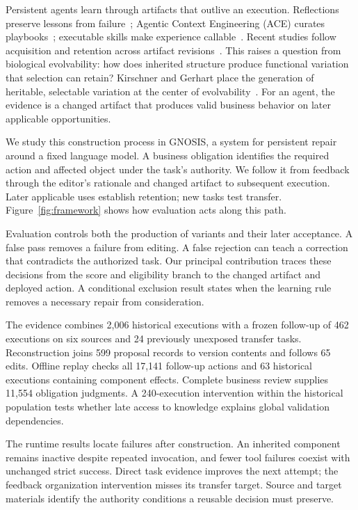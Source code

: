 \documentclass{ecai}
\newcommand{\Gnosis}{GNOSIS}
\begin{document}
Persistent agents learn through artifacts that outlive an execution. Reflections preserve lessons from failure~\cite{reflexion}; Agentic Context Engineering (ACE) curates playbooks~\cite{ace}; executable skills make experience callable~\cite{voyager}. Recent studies follow acquisition and retention across artifact revisions~\cite{singh2026agentplasticity,lin2026beyondendpoint}. This raises a question from biological evolvability: how does inherited structure produce functional variation that selection can retain? Kirschner and Gerhart place the generation of heritable, selectable variation at the center of evolvability~\cite{kirschner1998evolvability}. For an agent, the evidence is a changed artifact that produces valid business behavior on later applicable opportunities.

We study this construction process in \Gnosis{}, a system for persistent repair around a fixed language model. A business obligation identifies the required action and affected object under the task's authority. We follow it from feedback through the editor's rationale and changed artifact to subsequent execution. Later applicable uses establish retention; new tasks test transfer. Figure~\ref{fig:framework} shows how evaluation acts along this path.

Evaluation controls both the production of variants and their later acceptance. A false pass removes a failure from editing. A false rejection can teach a correction that contradicts the authorized task. Our principal contribution traces these decisions from the score and eligibility branch to the changed artifact and deployed action. A conditional exclusion result states when the learning rule removes a necessary repair from consideration.

The evidence combines 2,006 historical executions with a frozen follow-up of 462 executions on six sources and 24 previously unexposed transfer tasks. Reconstruction joins 599 proposal records to version contents and follows 65 edits. Offline replay checks all 17,141 follow-up actions and 63 historical executions containing component effects. Complete business review supplies 11,554 obligation judgments. A 240-execution intervention within the historical population tests whether late access to knowledge explains global validation dependencies.

The runtime results locate failures after construction. An inherited component remains inactive despite repeated invocation, and fewer tool failures coexist with unchanged strict success. Direct task evidence improves the next attempt; the feedback organization intervention misses its transfer target. Source and target materials identify the authority conditions a reusable decision must preserve.
\end{document}
